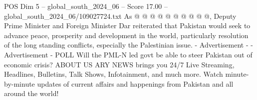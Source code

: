 \begin{textsample}{POS Dim 5 – global\_south\_2024\_06 – Score 17.00 – global\_south\_2024\_06/109027724.txt}
As @ @ @ @ @ @ @ @ @ @, Deputy Prime Minister and Foreign Minister Dar reiterated that Pakistan would seek to advance peace, prosperity and development in the world, particularly resolution of the long standing conflicts, especially the Palestinian issue. - Advertisement - - Advertisement - POLL Will the PML-N led govt be able to steer Pakistan out of economic crisis?
ABOUT US ARY NEWS brings you 24/7 Live Streaming, Headlines, Bulletins, Talk Shows, Infotainment, and much more.
Watch minute-by-minute updates of current affairs and happenings from Pakistan and all around the world!

\end{textsample}
